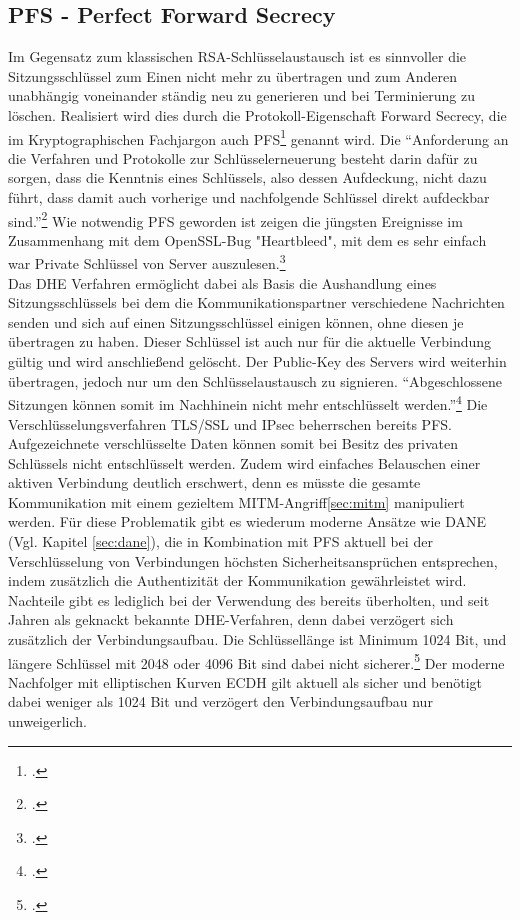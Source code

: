\documentclass  [paper=a4,
				fontsize=12pt,
				listof=totoc,
				bibliography=totoc
				]{scrreprt}
\begin{document}
			\subsection{PFS - Perfect Forward Secrecy}
				Im Gegensatz zum klassischen RSA-Schlüsselaustausch ist es sinnvoller die Sitzungsschlüssel %
				zum Einen nicht mehr zu übertragen und zum Anderen unabhängig voneinander ständig neu zu generieren und bei Terminierung zu löschen. Realisiert wird dies durch die Protokoll-Eigenschaft Forward Secrecy, die im Kryptographischen Fachjargon auch \ac{PFS}\footcite[Vgl.][]{Boeck2013} genannt wird. Die ``Anforderung an die Verfahren und Protokolle zur Schlüsselerneuerung besteht darin dafür zu sorgen, dass die Kenntnis eines Schlüssels, also dessen Aufdeckung, nicht dazu führt, dass damit auch vorherige und nachfolgende Schlüssel direkt aufdeckbar sind.''\footcite[S. 439]{Eckert2013} Wie notwendig \ac{PFS} geworden ist zeigen die jüngsten Ereignisse im Zusammenhang mit dem OpenSSL-Bug "Heartbleed", mit dem es sehr einfach war Private Schlüssel von Server auszulesen.\footcite[Vgl. ][]{Zhu2014} \medskip\\
				Das \ac{DHE} Verfahren ermöglicht dabei als Basis die Aushandlung eines Sitzungsschlüssels bei dem die Kommunikationspartner verschiedene Nachrichten senden und sich auf einen Sitzungsschlüssel einigen können, ohne diesen je übertragen zu haben. Dieser Schlüssel ist auch nur für die aktuelle Verbindung gültig und wird anschließend gelöscht. Der Public-Key des Servers wird weiterhin übertragen, jedoch nur um den Schlüsselaustausch zu signieren. ``Abgeschlossene Sitzungen können somit im Nachhinein nicht mehr entschlüsselt werden.''\footcite[Vgl. ][]{Schulz2014} Die Verschlüsselungsverfahren \ac{TLS/SSL} und IPsec beherrschen bereits \ac{PFS}.\medskip\\
				Aufgezeichnete verschlüsselte Daten können somit bei Besitz des privaten Schlüssels nicht entschlüsselt werden. Zudem wird einfaches Belauschen einer aktiven Verbindung deutlich erschwert, denn es müsste die gesamte Kommunikation mit einem gezieltem \ac{MITM}-Angriff\ref{sec:mitm} manipuliert werden. Für diese Problematik gibt es wiederum moderne Ansätze wie DANE (Vgl. Kapitel \ref{sec:dane}), die in Kombination mit \ac{PFS} aktuell bei der Verschlüsselung von Verbindungen höchsten Sicherheitsansprüchen entsprechen, indem zusätzlich die Authentizität der Kommunikation gewährleistet wird.\medskip\\
				Nachteile gibt es lediglich bei der Verwendung des bereits überholten, und seit Jahren als geknackt bekannte \ac{DHE}-Verfahren, denn dabei verzögert sich zusätzlich der Verbindungsaufbau. Die Schlüssellänge ist Minimum 1024 Bit, und längere Schlüssel mit 2048 oder 4096 Bit sind dabei nicht sicherer.\footcite[Vgl.][]{Boeck2013} Der moderne Nachfolger mit elliptischen Kurven \ac{ECDH} gilt aktuell als sicher und benötigt dabei weniger als 1024 Bit und verzögert den Verbindungsaufbau nur unweigerlich.\medskip\\
\end{document}
